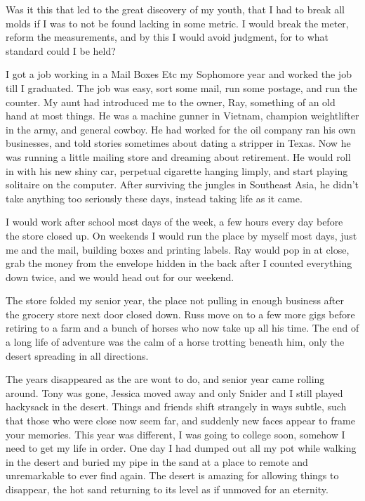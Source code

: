 \documentclass[ebook, 10pt, openright, onecolumn]{memoir}
\newcommand*\td[1]{
  \todo[inline]{
     #1 
  }
}
\newcommand*\finish{\td{ ----- Finish this section -----}}
\begin{document}
Was it this that led to the great discovery of my youth, that I had to break all
molds if I was to not be found lacking in some metric.  I would break the
meter, reform the measurements, and by this I would avoid judgment, for to what
standard could I be held?

\finish

I got a job working in a Mail Boxes Etc my Sophomore year and worked the job
till I graduated.  The job was easy, sort some mail, run some postage, and run
the counter.  My aunt had introduced me to the owner, Ray, something of an old
hand at most things.  He was a machine gunner in Vietnam, champion weightlifter
in the army, and general cowboy.  He had worked for the oil company ran his own
businesses, and told stories sometimes about dating a stripper in Texas.  Now he
was running a little mailing store and dreaming about retirement.  He would roll
in with his new shiny car, perpetual cigarette hanging limply, and start playing
solitaire on the computer.  After surviving the jungles in Southeast Asia, he
didn't take anything too seriously these days, instead taking life as it came.

I would work after school most days of the week, a few hours every day before
the store closed up.  On weekends I would run the place by myself most days,
just me and the mail, building boxes and printing labels. Ray would pop in at
close, grab the money from the envelope hidden in the back after I counted
everything down twice, and we would head out for our weekend.

The store folded my senior year, the place not pulling in enough business after
the grocery store next door closed down.  Russ move on to a few more gigs before
retiring to a farm and a bunch of horses who now take up all his time.  The end
of a long life of adventure was the calm of a horse trotting beneath him, only
the desert spreading in all directions.

\finish

The years disappeared as the are wont to do, and senior year came rolling
around.  Tony was gone, Jessica moved away and only Snider and I still played
hackysack in the desert.  Things and friends shift strangely in ways subtle,
such that those who were close now seem far, and suddenly new faces appear to
frame your memories.  This year was different, I was going to college soon,
somehow I need to get my life in order.  One day I had dumped out all my pot
while walking in the desert and buried my pipe in the sand at a place to remote
and unremarkable to ever find again.  The desert is amazing for allowing things
to disappear, the hot sand returning to its level as if unmoved for an
eternity.
\end{document}
